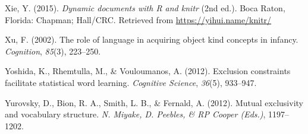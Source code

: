 \documentclass[english,floatsintext,man]{apa6}
\theoremstyle{definition}
\theoremstyle{definition}
\theoremstyle{definition}
\theoremstyle{remark}
\begin{document}
\leavevmode\hypertarget{ref-R-knitr}{}%
Xie, Y. (2015). \emph{Dynamic documents with R and knitr} (2nd ed.).
Boca Raton, Florida: Chapman; Hall/CRC. Retrieved from
\url{https://yihui.name/knitr/}

\leavevmode\hypertarget{ref-xu2002role}{}%
Xu, F. (2002). The role of language in acquiring object kind concepts in
infancy. \emph{Cognition}, \emph{85}(3), 223--250.

\leavevmode\hypertarget{ref-yoshida2012exclusion}{}%
Yoshida, K., Rhemtulla, M., \& Vouloumanos, A. (2012). Exclusion
constraints facilitate statistical word learning. \emph{Cognitive
Science}, \emph{36}(5), 933--947.

\leavevmode\hypertarget{ref-yurovsky2012mutual}{}%
Yurovsky, D., Bion, R. A., Smith, L. B., \& Fernald, A. (2012). Mutual
exclusivity and vocabulary structure. \emph{N. Miyake, D. Peebles, \& RP
Cooper (Eds.)}, 1197--1202.
\end{document}
